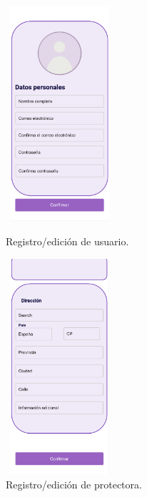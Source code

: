 \documentclass[a4paper, 12pt]{article}
\begin{document}
\begin{figure}[H]
   	\begin{minipage}{0.48\textwidth}
		\begin{center}
			{\includegraphics[height=8cm, width=4cm]{design/UserRegister.jpg}\par}
			\caption{Registro/edición de usuario.}
			\medskip
		\end{center}  
	\end{minipage}\hfill
   	\begin{minipage}{0.48\textwidth}
		\begin{center}
			{\includegraphics[height=8cm, width=4cm]{design/CompanyRegister.jpg}\par}
			\caption{Registro/edición de protectora.}
			\medskip
		\end{center}  
	\end{minipage}\hfill
\end{figure}
\end{document}
